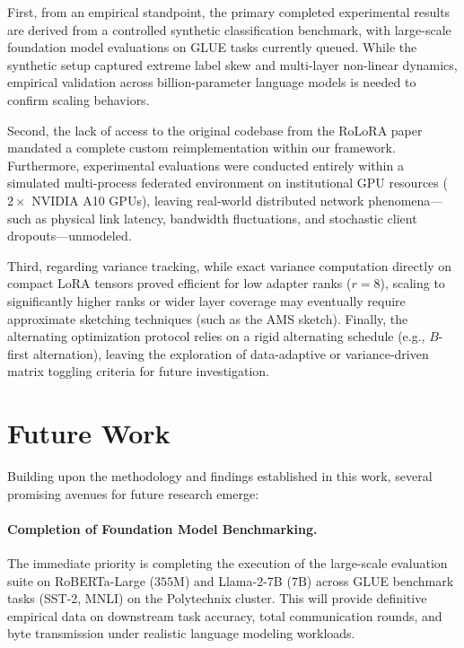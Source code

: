 First, from an empirical standpoint, the primary completed experimental results are derived from a controlled synthetic classification benchmark, with large-scale foundation model evaluations on GLUE tasks currently queued. While the synthetic setup captured extreme label skew and multi-layer non-linear dynamics, empirical validation across billion-parameter language models is needed to confirm scaling behaviors.

Second, the lack of access to the original codebase from the RoLoRA paper mandated a complete custom reimplementation within our framework. Furthermore, experimental evaluations were conducted entirely within a simulated multi-process federated environment on institutional GPU resources ($2\times$ NVIDIA A10 GPUs), leaving real-world distributed network phenomena—such as physical link latency, bandwidth fluctuations, and stochastic client dropouts—unmodeled.

Third, regarding variance tracking, while exact variance computation directly on compact LoRA tensors proved efficient for low adapter ranks ($r=8$), scaling to significantly higher ranks or wider layer coverage may eventually require approximate sketching techniques (such as the AMS sketch). Finally, the alternating optimization protocol relies on a rigid alternating schedule (e.g., $B$-first alternation), leaving the exploration of data-adaptive or variance-driven matrix toggling criteria for future investigation.

\section{Future Work}
\label{sec:future_work}

Building upon the methodology and findings established in this work, several promising avenues for future research emerge:

\paragraph{Completion of Foundation Model Benchmarking.}
The immediate priority is completing the execution of the large-scale evaluation suite on RoBERTa-Large ($355\text{M}$) and Llama-2-7B ($7\text{B}$) across GLUE benchmark tasks (SST-2, MNLI) on the Polytechnix cluster. This will provide definitive empirical data on downstream task accuracy, total communication rounds, and byte transmission under realistic language modeling workloads.

